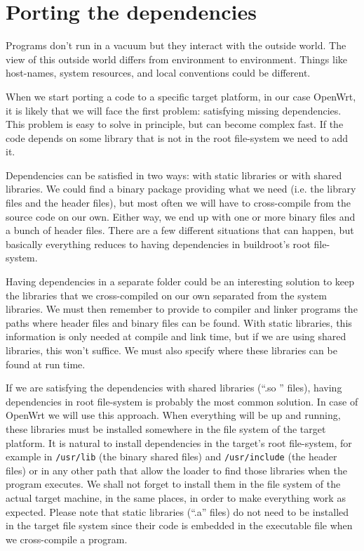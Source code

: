 \chapter{Porting the dependencies}\label{satisfy_dependencies}

Programs don’t run in a vacuum but they interact with the outside world.
The view of this outside world differs from environment to environment.
Things like host-names, system resources, and local conventions could be different.

When we start porting a code to a specific target platform, in our case OpenWrt, it is likely that we will face the first problem: satisfying missing dependencies.
This problem is easy to solve in principle, but can become complex fast.
If the code depends on some library that is not in the root file-system we need to add it.

Dependencies can be satisfied in two ways: with static libraries or with shared libraries.
We could find a binary package providing what we need (i.e. the library files and the header files), but most often we will have to cross-compile from the source code on our own.
Either way, we end up with one or more binary files and a bunch of header files.
There are a few different situations that can happen, but basically everything reduces to having dependencies in buildroot's root file-system.

Having dependencies in a separate folder could be an interesting solution to keep the libraries that we cross-compiled on our own separated from the system libraries.
We must then remember to provide to compiler and linker programs the paths where header files and binary files can be found.
With static libraries, this information is only needed at compile and link time, but if we are using shared libraries, this won’t suffice.
We must also specify where these libraries can be found at run time.

If we are satisfying the dependencies with shared libraries (“.so ” files), having dependencies in root file-system is probably the most common solution.
In case of OpenWrt we will use this approach.
When everything will be up and running, these libraries must be installed somewhere in the file system of the target platform.
It is natural to install dependencies in the target's root file-system, for example in {\tt /usr/lib} (the binary shared files) and {\tt /usr/include} (the header files) or in any other path that allow the loader to find those libraries when the program executes.
We shall not forget to install them in the file system of the actual target machine, in the same places, in order to make everything work as expected.
Please note that static libraries (“.a” files) do not need to be installed in the target file system since their code is embedded in the executable file when we cross-compile a program\cite{fabrizio}.




